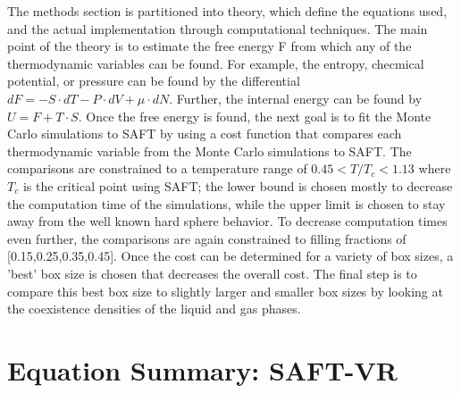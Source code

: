 \newcommand\numberthis{\addtocounter{equation}{1}\tag{\theequation}}
The methods section is partitioned into theory, which define the equations used, and the actual implementation through computational techniques. The main point of the theory is to estimate the free energy F from which any of the thermodynamic variables can be found. For example, the entropy, checmical potential, or pressure can be found by the differential $dF=-S\cdot dT -P\cdot dV+\mu\cdot dN$. Further, the internal energy can be found by $U=F+T\cdot S$. Once the free energy is found, the next goal is to fit the Monte Carlo simulations to SAFT by using a cost function that compares each thermodynamic variable from the Monte Carlo simulations to SAFT. The comparisons are constrained to a temperature range of $0.45<T/T_c<1.13$ where $T_c$ is the critical point using SAFT; the lower bound is chosen mostly to decrease the computation time of the simulations, while the upper limit is chosen to stay away from the well known hard sphere behavior. To decrease computation times even further, the comparisons are again constrained to filling fractions of [0.15,0.25,0.35,0.45]. Once the cost can be determined for a variety of box sizes, a 'best' box size is chosen that decreases the overall cost. The final step is to compare this best box size to slightly larger and smaller box sizes by looking at the coexistence densities of the liquid and gas phases.

\section{Equation Summary: SAFT-VR}

